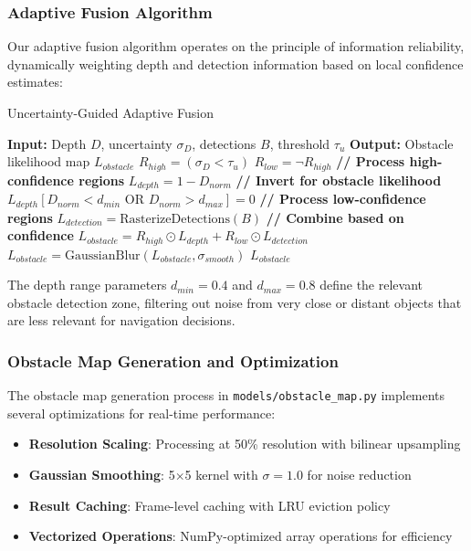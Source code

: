 \documentclass[10pt]{article}
\begin{document}
\subsubsection{Adaptive Fusion Algorithm}

Our adaptive fusion algorithm operates on the principle of information reliability, dynamically weighting depth and detection information based on local confidence estimates:

\begin{algorithm}
\caption{Uncertainty-Guided Adaptive Fusion}
\begin{algorithmic}
\STATE \textbf{Input:} Depth $D$, uncertainty $\sigma_D$, detections $B$, threshold $\tau_u$
\STATE \textbf{Output:} Obstacle likelihood map $L_{obstacle}$
\STATE $R_{high} = (\sigma_D < \tau_u)$
\STATE $R_{low} = \neg R_{high}$
\STATE \textbf{// Process high-confidence regions}
\STATE $L_{depth} = 1 - D_{norm}$ \textbf{// Invert for obstacle likelihood}
\STATE $L_{depth}[D_{norm} < d_{min} \text{ OR } D_{norm} > d_{max}] = 0$
\STATE \textbf{// Process low-confidence regions}
\STATE $L_{detection} = \text{RasterizeDetections}(B)$
\STATE \textbf{// Combine based on confidence}
\STATE $L_{obstacle} = R_{high} \odot L_{depth} + R_{low} \odot L_{detection}$
\STATE $L_{obstacle} = \text{GaussianBlur}(L_{obstacle}, \sigma_{smooth})$
\RETURN $L_{obstacle}$
\end{algorithmic}
\end{algorithm}

The depth range parameters $d_{min} = 0.4$ and $d_{max} = 0.8$ define the relevant obstacle detection zone, filtering out noise from very close or distant objects that are less relevant for navigation decisions.

\subsubsection{Obstacle Map Generation and Optimization}

The obstacle map generation process in \texttt{models/obstacle\_map.py} implements several optimizations for real-time performance:

\begin{itemize}
\item \textbf{Resolution Scaling}: Processing at 50\% resolution with bilinear upsampling
\item \textbf{Gaussian Smoothing}: 5$\times$5 kernel with $\sigma = 1.0$ for noise reduction
\item \textbf{Result Caching}: Frame-level caching with LRU eviction policy
\item \textbf{Vectorized Operations}: NumPy-optimized array operations for efficiency
\end{itemize}
\end{document}
